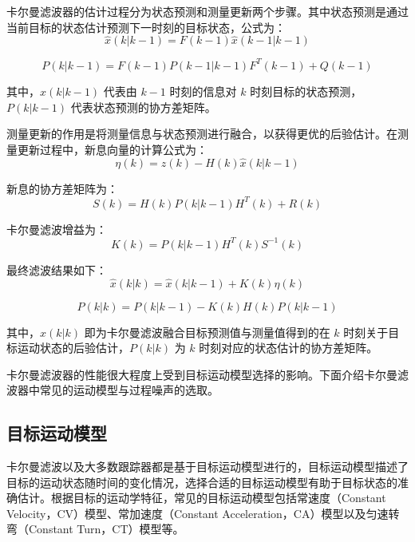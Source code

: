 \documentclass{xdupgthesis}
\begin{document}
卡尔曼滤波器的估计过程分为状态预测和测量更新两个步骤。其中状态预测是通过当前目标的状态估计预测下一时刻的目标状态，公式为：
\begin{equation}
	\hat{x}(k|k-1)=F(k-1)\hat{x}(k-1|k-1)
	\tag{2-8}
\end{equation}

\begin{equation}
	P(k|k-1)=F(k-1)P(k-1|k-1)F^{T}(k-1)+Q(k-1)
	\tag{2-9}
\end{equation}

其中，$\hat{x}(k|k-1)$ 代表由 $k-1$ 时刻的信息对 $k$ 时刻目标的状态预测，$P(k|k-1)$ 代表状态预测的协方差矩阵。

测量更新的作用是将测量信息与状态预测进行融合，以获得更优的后验估计。在测量更新过程中，新息向量的计算公式为：
\begin{equation}
	\eta(k)=z(k)-H(k)\hat{x}(k|k-1)
	\tag{2-10}
\end{equation}

新息的协方差矩阵为：
\begin{equation}
	S(k)=H(k)P(k|k-1)H^{T}(k)+R(k)
	\tag{2-11}
\end{equation}

卡尔曼滤波增益为：
\begin{equation}
	K(k)=P(k|k-1)H^{T}(k)S^{-1}(k)
	\tag{2-12}
\end{equation}

最终滤波结果如下：
\begin{equation}
	\hat{x}(k|k)=\hat{x}(k|k-1)+K(k)\eta(k)
	\tag{2-13}
\end{equation}

\begin{equation}
	P(k|k)=P(k|k-1)-K(k)H(k)P(k|k-1)
	\tag{2-14}
\end{equation}

其中，$\hat{x}(k|k)$ 即为卡尔曼滤波融合目标预测值与测量值得到的在 $k$ 时刻关于目标运动状态的后验估计，$P(k|k)$ 为 $k$ 时刻对应的状态估计的协方差矩阵。

卡尔曼滤波器的性能很大程度上受到目标运动模型选择的影响。下面介绍卡尔曼滤波器中常见的运动模型与过程噪声的选取。

\subsection{目标运动模型}

卡尔曼滤波以及大多数跟踪器都是基于目标运动模型进行的，目标运动模型描述了目标的运动状态随时间的变化情况，选择合适的目标运动模型有助于目标状态的准确估计。根据目标的运动学特征，常见的目标运动模型包括常速度（Constant Velocity，CV）模型、常加速度（Constant Acceleration，CA）模型以及匀速转弯（Constant Turn，CT）模型等。
\end{document}

